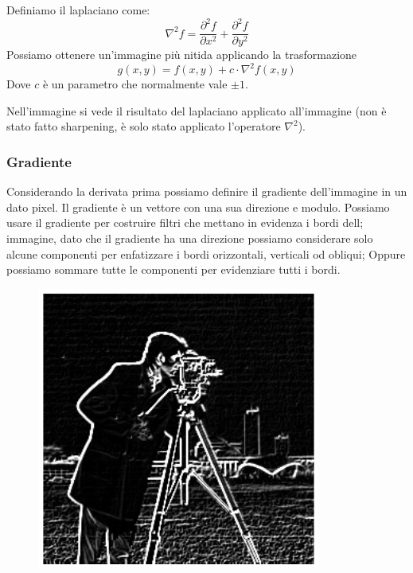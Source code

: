 Definiamo il laplaciano come:
\begin{equation}
	\nabla^2 f = \frac{\partial^2 f}{\partial x^2} +  \frac{\partial^2 f}{\partial y^2}
\end{equation}
Possiamo ottenere un'immagine più nitida applicando la trasformazione
\begin{equation}
	g(x,y) = f(x,y) + c\cdot \nabla^2 f(x,y)
\end{equation}
Dove $c$ è un parametro che normalmente vale $\pm 1$.

Nell'immagine si vede il risultato del laplaciano applicato all'immagine (non è stato fatto sharpening, è solo stato applicato l'operatore $\nabla ^2$).
\subsubsection{Gradiente}
Considerando la derivata prima possiamo definire il gradiente dell'immagine in un dato pixel. Il gradiente è un vettore con una sua direzione e modulo. Possiamo usare il gradiente per costruire filtri che mettano in evidenza i bordi dell; immagine, dato che il gradiente ha una direzione possiamo considerare solo alcune componenti per enfatizzare i bordi orizzontali, verticali od obliqui; Oppure possiamo sommare tutte le componenti per evidenziare tutti i bordi.
\begin{figure}
	\vspace{-.4cm}
	\centering
	\includegraphics[width=.9\linewidth]{Picture/Cameraman_Gradient}
\end{figure}

